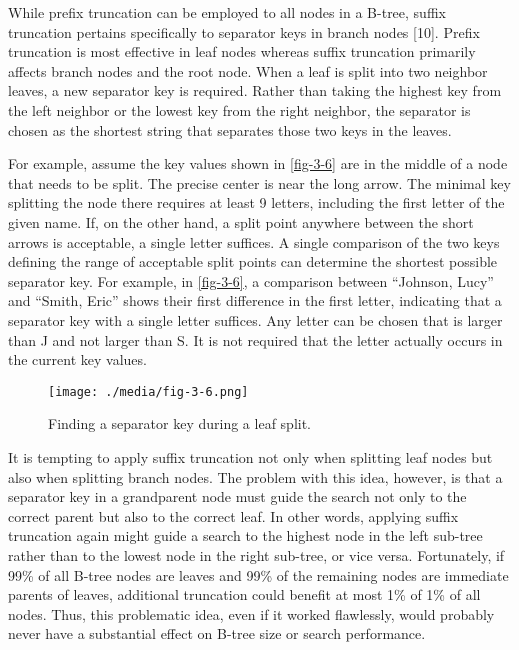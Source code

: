 While prefix truncation can be employed to all nodes in a B-tree, suffix
truncation pertains specifically to separator keys in branch nodes
{[}10{]}. Prefix truncation is most effective in leaf nodes whereas
suffix truncation primarily affects branch nodes and the root node. When
a leaf is split into two neighbor leaves, a new separator key is
required. Rather than taking the highest key from the left neighbor or
the lowest key from the right neighbor, the separator is chosen as the
shortest string that separates those two keys in the leaves.

For example, assume the key values shown in \autoref{fig-3-6} are in the middle
of a node that needs to be split. The precise center is near the long
arrow. The minimal key splitting the node there requires at least 9
letters, including the first letter of the given name. If, on the other
hand, a split point anywhere between the short arrows is acceptable, a
single letter suffices. A single comparison of the two keys defining the
range of acceptable split points can determine the shortest possible
separator key. For example, in \autoref{fig-3-6}, a comparison between
``Johnson, Lucy'' and ``Smith, Eric'' shows their first difference in
the first letter, indicating that a separator key with a single letter
suffices. Any letter can be chosen that is larger than J and not larger
than S. It is not required that the letter actually occurs in the
current key values.

\begin{figure}
  \centering
  \texttt{[image: ./media/fig-3-6.png]}

  \caption{Finding a separator key during a leaf split.\label{fig-3-6}}
\end{figure}

It is tempting to apply suffix truncation not only when splitting leaf
nodes but also when splitting branch nodes. The problem with this idea,
however, is that a separator key in a grandparent node must guide the
search not only to the correct parent but also to the correct leaf. In
other words, applying suffix truncation again might guide a search to
the highest node in the left sub-tree rather than to the lowest node in
the right sub-tree, or vice versa. Fortunately, if 99\% of all B-tree
nodes are leaves and 99\% of the remaining nodes are immediate parents
of leaves, additional truncation could benefit at most 1\% of 1\% of all
nodes. Thus, this problematic idea, even if it worked flawlessly, would
probably never have a substantial effect on B-tree size or search
performance.

